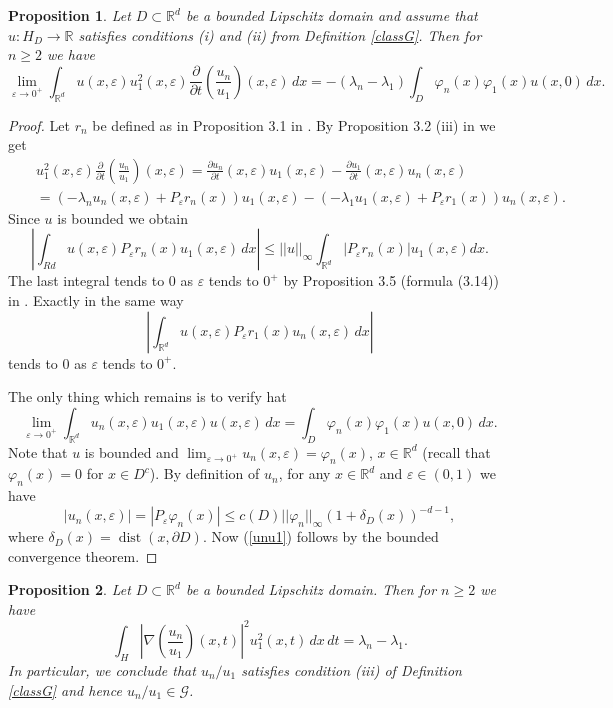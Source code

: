 \documentclass[11pt,leqno]{article}
\DeclareMathOperator{\dist}{dist}
\newtheorem{prop}{Proposition}[section]
\theoremstyle{definition}
\newcommand{\Rd}{\mathbb{R}^d}
\newcommand{\R}{\mathbb{R}}
\newcommand{\eps}{\varepsilon}
\numberwithin{equation}{section}
\begin{document}
\begin{prop}
\label{limiteps}
Let $D \subset \Rd$ be a bounded Lipschitz domain and assume that $u: H_D \to \R$ satisfies conditions (i) and (ii)
 from Definition \ref{classG}. Then for  $n \ge 2$ we have 
$$
\lim_{\eps \to 0^+} \int_{\Rd} u(x,\eps) u_1^2(x,\eps) \frac{\partial}{\partial t} \left(\frac{u_n}{u_1}\right)(x,\eps) \, dx
= - (\lambda_n - \lambda_1) \int_{D} \varphi_n(x) \varphi_1(x) u(x,0) \, dx.
$$
\end{prop}

\begin{proof}
Let $r_n$ be defined as in Proposition 3.1 in \cite{BK}. By Proposition 3.2 (iii) in \cite{BK}
we get 
\begin{eqnarray*}
&&
u_1^2(x,\eps) \frac{\partial}{\partial t} \left(\frac{u_n}{u_1}\right)(x,\eps)
= \frac{\partial u_n}{\partial t}(x,\eps) u_1(x,\eps) 
- \frac{\partial u_1}{\partial t}(x,\eps) u_n(x,\eps)
\\
&&
= (- \lambda_n u_n(x,\eps) + P_{\eps}r_n(x)) u_1(x,\eps)
- (- \lambda_1 u_1(x,\eps) + P_{\eps}r_1(x)) u_n(x,\eps).
\end{eqnarray*}
Since $u$ is bounded we obtain 
$$
\left| \int_{Rd} u(x,\eps) P_{\eps}r_n(x) u_1(x,\eps) \, dx \right|
\le ||u||_{\infty} \int_{\Rd} |P_{\eps}r_n(x)| u_1(x,\eps) dx.
$$
The last integral tends to $0$ as $\eps$ tends to $0^+$ by Proposition 3.5 (formula (3.14)) in \cite{BK}. Exactly in the same way
$$
\left| \int_{\Rd} u(x,\eps) P_{\eps}r_1(x) u_n(x,\eps) \, dx \right|
$$
tends to $0$ as $\eps$ tends to $0^+$.

The only thing which remains is to verify hat 
\begin{equation}
\label{unu1}
\lim_{\eps \to 0^+} \int_{\Rd} u_n(x,\eps) u_1(x,\eps) u(x,\eps) \, dx 
= \int_{D} \varphi_n(x) \varphi_1(x) u(x,0) \, dx.
\end{equation}
Note that $u$ is bounded and $\lim_{\eps \to 0^+} u_n(x,\eps) = 
\varphi_n(x)$, $x \in \Rd$ (recall that $\varphi_n(x) = 0$ for $x \in D^c$). By definition of
$u_n$, for any $x \in \Rd$ and $\eps \in (0,1)$ we have
$$
|u_n(x,\eps)| = |P_{\eps} \varphi_n(x)| \le c(D) ||\varphi_n||_{\infty} (1 + \delta_D(x))^{-d - 1},
$$
where $\delta_D(x) = \dist(x,\partial D)$. Now (\ref{unu1})
 follows by the bounded convergence theorem. 
\end{proof}

\begin{prop}
\label{Hunu1}
Let $D \subset \Rd$ be a bounded Lipschitz domain. Then for $n \ge 2$ we have
$$
\int_{H}  \left| \nabla \left(\frac{u_n}{u_1}\right)(x,t)\right|^2 u_1^2(x,t) \, dx \, dt 
= \lambda_n - \lambda_1.
$$
In particular, we conclude that $u_n/u_1$ satisfies condition (iii) of Definition \ref{classG} and hence $u_n/u_1 \in \mathcal{G}$.
\end{prop}
\end{document}
